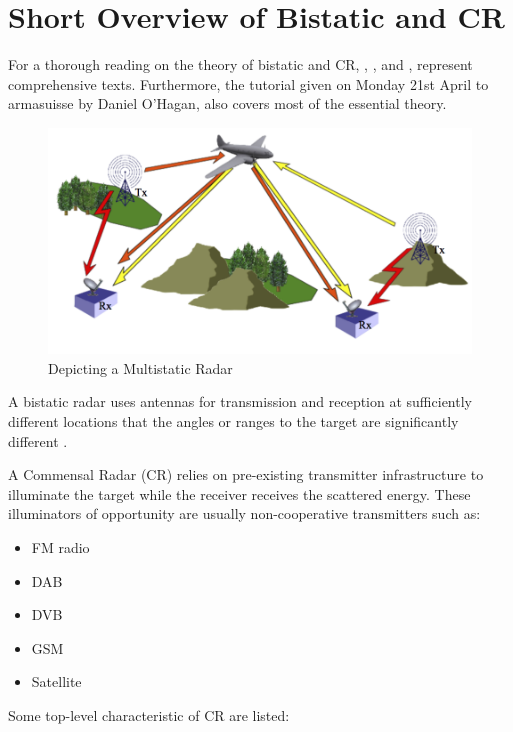 \section{Short Overview of Bistatic and CR}

For a thorough reading on the theory of bistatic and CR, \cite{willis}, \cite{willis1}, \cite{chern} and \cite{chern1}, represent comprehensive texts. Furthermore, the tutorial given on Monday 21st April to armasuisse by Daniel O'Hagan, also covers most of the essential theory. 

\begin{figure}[]
\centering
  \includegraphics{./figs/CR_1}
  \caption{Depicting a Multistatic Radar}\label{fig:CR_1}
\end{figure}


A bistatic radar uses antennas for transmission and reception at sufficiently different locations that the angles or ranges to the target are significantly different \cite{stand}.

A Commensal Radar (CR) relies on pre-existing transmitter infrastructure to illuminate the target while the receiver receives the scattered energy. These illuminators of opportunity are usually non-cooperative transmitters such as:

\begin{itemize}
\item FM radio
\item DAB 
\item DVB 
\item GSM 
\item Satellite 
\end{itemize}


Some top-level characteristic of CR are listed: 

